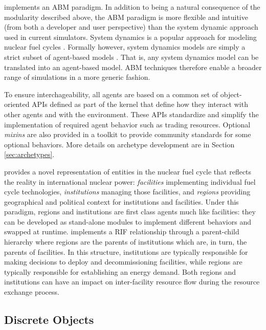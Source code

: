 \Cyclus implements an \gls{ABM} paradigm.  In addition to being a natural
consequence of the modularity described above, the \gls{ABM} paradigm is more
flexible and intuitive (from both a developer and user perspective) than the
system dynamic approach used in current simulators.  System dynamics is a
popular approach for modeling nuclear fuel cycles
\cite{jacobson_vision_2009,van_den_durpel_daness_2009,guerin_impact_2009,guerin_benchmark_2009}.
Formally however, system dynamics models are simply a strict subset of
agent-based models \cite{macal_agent-based_2010}.  That is, any system
dynamics model can be translated into an agent-based model.  \gls{ABM}
techniques therefore enable a broader range of simulations in a more generic
fashion.

To ensure interchageability, all agents are based on a common set of
object-oriented \glspl{API} defined as part of the \Cyclus kernel that define
how they interact with other agents and with the environment.  These
\glspl{API} standardize and simplify the implementation of required agent
behavior such as trading resources.  Optional \textit{mixins} are also
provided in a toolkit to provide community standards for some optional
behaviors.  More details on archetype development are in Section
\ref{sec:archetypes}.

\Cyclus provides a novel representation of entities in the nuclear fuel cycle
that reflects the reality in international nuclear power: \textit{facilities}
implementing individual fuel cycle technologies, \textit{institutions}
managing those facilities, and \textit{regions} providing geographical and
political context for institutions and facilities.  Under this paradigm,
regions and institutions are first class agents much like facilities: they can
be developed as stand-alone modules to implement different behaviors and
swapped at runtime.  \Cyclus implements a \gls{RIF} relationship through a
parent-child hierarchy where regions are the parents of institutions which
are, in turn, the parents of facilities.  In this structure, institutions are
typically responsible for making decisions to deploy and decommissioning
facilities, while regions are typically responsible for establishing an energy
demand.  Both regions and institutions can have an impact on inter-facility
resource flow during the resource exchange process.

\subsection{Discrete Objects}

